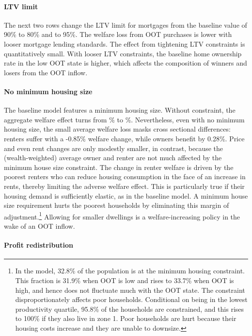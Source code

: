 \documentclass[letterpaper,12pt,dvipsnames,usenames]{article}
\theoremstyle{definition}
\begin{document}
\begin{spacing}{1.25}
{\paragraph{LTV limit}

The next two rows change the LTV limit for mortgages from the baseline value of 90\% to 80\% and to 95\%. The welfare loss from OOT purchases is lower with looser mortgage lending standards. The effect from tightening LTV constraints is quantitatively small. With looser LTV constraints, the baseline home ownership rate in the low OOT state is higher, which affects the composition of winners and losers from the OOT inflow.

\paragraph{No minimum housing size}

The baseline model features a minimum housing size. Without constraint, the aggregate welfare effect turns from {}\% to {}\%. Nevertheless, even with no minimum housing size, the small average welfare loss masks cross sectional differences: renters suffer with a -0.85\% welfare change, while owners benefit by 0.28\%. Price  and even rent changes are only modestly smaller, in contrast, because the (wealth-weighted) average owner and renter are not much affected by the minimum house size constraint. The change in renter welfare is driven by the poorest renters who can reduce housing consumption in the face of an increase in rents, thereby limiting the adverse welfare effect. This is particularly true if their housing demand is sufficiently elastic, as in the baseline model. A minimum house size requirement hurts the poorest households by eliminating this margin of adjustment.\footnote{In the model, 32.8\% of the population is at the minimum housing constraint. This fraction is 31.9\% when OOT is low and rises to 33.7\% when OOT is high, and hence does not fluctuate much with the OOT state. The constraint disproportionately affects poor households. Conditional on being in the lowest productivity quartile, 95.8\% of the households are constrained, and this rises to 100\% if they also live in zone 1. Poor households are hurt because their housing costs increase and they are unable to downsize.} Allowing for smaller dwellings is a welfare-increasing policy in the wake of an OOT inflow.

\paragraph{Profit redistribution}

}
\end{spacing}
\end{document}
